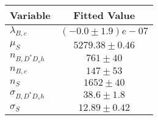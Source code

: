 \begin{tabular}[t]{lc}
\hline
Variable &Fitted Value\\
\hline\hline
$\lambda_{B,c}$&$(-0.0\pm1.9)e-07$\\
\hline
$\mu_S$&$5279.38\pm0.46$\\
\hline
$n_{B, D^* D_s h}$&$761\pm40$\\
\hline
$n_{B,c}$&$147\pm53$\\
\hline
$n_S$&$1652\pm40$\\
\hline
$\sigma_{B, D^* D_s h}$&$38.6\pm1.8$\\
\hline
$\sigma_S$&$12.89\pm0.42$\\
\hline
\end{tabular}